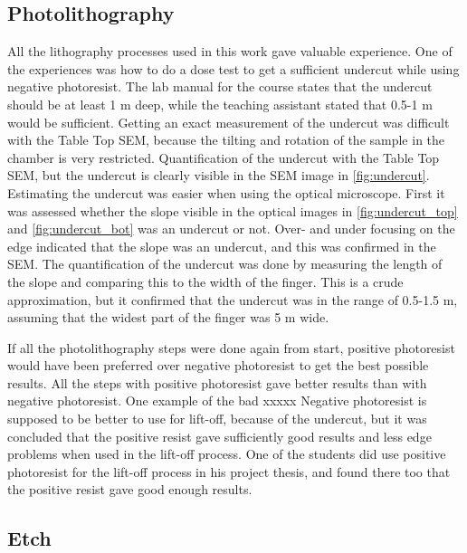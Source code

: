 
\subsection{Photolithography}
\label{sec:discussion:photolithography}

All the lithography processes used in this work gave valuable experience.
One of the experiences was how to do a dose test to get a sufficient undercut while using negative photoresist. 
The lab manual for the course \cite{labmanual} states that the undercut should be at least 1 \textmu m deep, while the teaching assistant stated that 0.5-1 \textmu m would be sufficient.
Getting an exact measurement of the undercut was difficult with the Table Top SEM, because the tilting and rotation of the sample in the chamber is very restricted. 
Quantification of the undercut with the Table Top SEM, but the undercut is clearly visible in the SEM image in \autoref{fig:undercut}.
Estimating the undercut was easier when using the optical microscope. 
First it was assessed whether the slope visible in the optical images in \autoref{fig:undercut_top} and \autoref{fig:undercut_bot} was an undercut or not.
Over- and under focusing on the edge indicated that the slope was an undercut, and this was confirmed in the SEM. 
The quantification of the undercut was done by measuring the length of the slope and comparing this to the width of the finger. 
This is a crude approximation, but it confirmed that the undercut was in the range of 0.5-1.5 \textmu m, assuming that the widest part of the finger was 5 \textmu m wide.


If all the photolithography steps were done again from start, positive photoresist would have been preferred over negative photoresist to get the best possible results.
All the steps with positive photoresist gave better results than with negative photoresist.
One example of the bad xxxxx
Negative photoresist is supposed to be better to use for lift-off, because of the undercut, but it was concluded that the positive resist gave sufficiently good results and less edge problems when used in the lift-off process.
One of the students did use positive photoresist for the lift-off process in his project thesis, and found there too that the positive resist gave good enough results.


\subsection{Etch}
\label{sec:discussion:etch}

